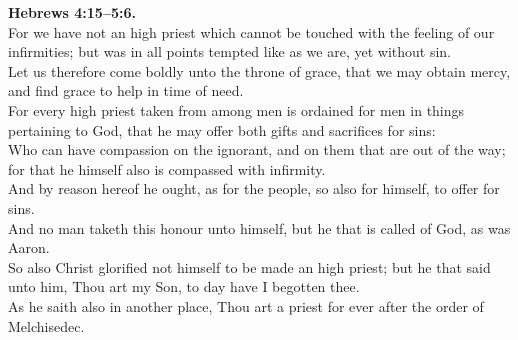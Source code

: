 \documentclass[10pt]{article} %
\begin{document}
{\begin{minipage}[t]{0.45\textwidth}
\textbf{Hebrews 4:15--5:6.}\\
For we have not an high priest which cannot be touched with the feeling of our infirmities; but was in all points tempted like as we are, yet without sin.\\
Let us therefore come boldly unto the throne of grace, that we may obtain mercy, and find grace to help in time of need.\\
For every high priest taken from among men is ordained for men in things pertaining to God, that he may offer both gifts and sacrifices for sins:\\
Who can have compassion on the ignorant, and on them that are out of the way; for that he himself also is compassed with infirmity.\\
And by reason hereof he ought, as for the people, so also for himself, to offer for sins.\\
And no man taketh this honour unto himself, but he that is called of God, as was Aaron.\\
So also Christ glorified not himself to be made an high priest; but he that said unto him, Thou art my Son, to day have I begotten thee.\\
As he saith also in another place, Thou art a priest for ever after the order of Melchisedec.\\

\end{minipage}}
\vspace*{\fill}
\newpage
\Huge%
\vspace*{\fill}
\begin{spacing}{1.0}%
\end{spacing}
\vspace*{\fill}
\end{document}
